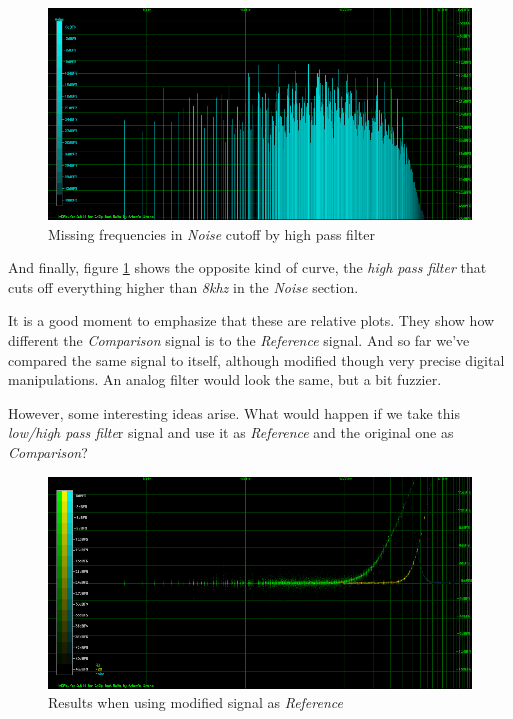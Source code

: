 \documentclass[10pt,a4paper]{report}
\newcommand{\fkhz}[1]{\textit{#1\acrshort{khz}}}
\begin{document}
\begin{figure}[H]
	\centering
	\includegraphics[width=1.0\linewidth]{images/interpretation/Plot4-6-Missing-Noise.png}
	\caption[Missing Noise]{Missing frequencies in \textit{Noise} cutoff by high pass filter}
	\label{fig:plot4-6-missing-noise}
\end{figure}

And finally, figure \ref{fig:plot4-6-missing-noise} shows the opposite kind of curve, the \textit{high pass filter} that cuts off everything higher than \fkhz{8} in the \textit{Noise} section.

It is a good moment to emphasize that these are relative plots. They show how different the \textit{Comparison} signal is to the \textit{Reference} signal. And so far we've compared the same signal to itself, although modified though very precise digital manipulations. An analog filter would look the same, but a bit fuzzier. 

However, some interesting ideas arise. What would happen if we take this \textit{low/high pass filte}r signal and use it as \textit{Reference} and the original one as \textit{Comparison}?

\begin{figure}[H]
	\centering
	\includegraphics[width=1.0\linewidth]{images/interpretation/Plot4-7-Reversed.png}
	\caption[Reversed]{Results when using modified signal as \textit{Reference}}
	\label{fig:plot4-7-reversed}
\end{figure}
\end{document}
